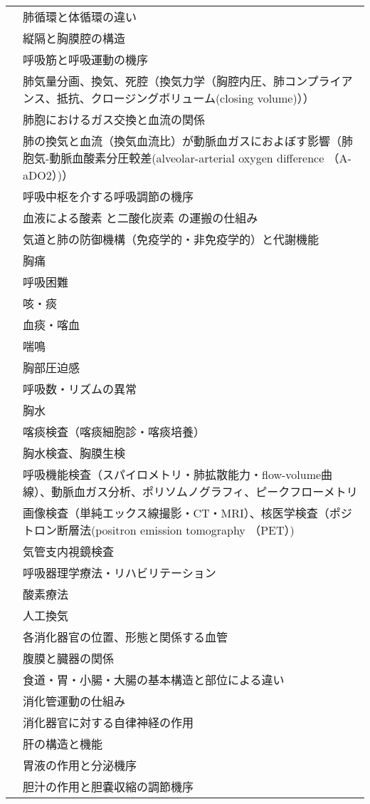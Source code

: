 \begin{xltabular}{\linewidth}{XX}
 & 肺循環と体循環の違い \\
 & 縦隔と胸膜腔の構造 \\
 & 呼吸筋と呼吸運動の機序 \\
 & 肺気量分画、換気、死腔（換気力学（胸腔内圧、肺コンプライアンス、抵抗、クロージングボリューム(closing volume)）） \\
 & 肺胞におけるガス交換と血流の関係 \\
 & 肺の換気と血流（換気血流比）が動脈血ガスにおよぼす影響（肺胞気-動脈血酸素分圧較差(alveolar-arterial oxygen difference （A-aDO2）)） \\
 & 呼吸中枢を介する呼吸調節の機序 \\
 & 血液による酸素 と二酸化炭素 の運搬の仕組み \\
 & 気道と肺の防御機構（免疫学的・非免疫学的）と代謝機能 \\
 & 胸痛 \\
 & 呼吸困難 \\
 & 咳・痰 \\
 & 血痰・喀血 \\
 & 喘鳴 \\
 & 胸部圧迫感 \\
 & 呼吸数・リズムの異常 \\
 & 胸水 \\
 & 喀痰検査（喀痰細胞診・喀痰培養） \\
 & 胸水検査、胸膜生検 \\
 & 呼吸機能検査（スパイロメトリ・肺拡散能力・flow-volume曲線）、動脈血ガス分析、ポリソムノグラフィ、ピークフローメトリ \\
 & 画像検査（単純エックス線撮影・CT・MRI）、核医学検査（ポジトロン断層法(positron emission tomography （PET）) \\
 & 気管支内視鏡検査 \\
 & 呼吸器理学療法・リハビリテーション \\
 & 酸素療法 \\
 & 人工換気 \\
 & 各消化器官の位置、形態と関係する血管 \\
 & 腹膜と臓器の関係 \\
 & 食道・胃・小腸・大腸の基本構造と部位による違い \\
 & 消化管運動の仕組み \\
 & 消化器官に対する自律神経の作用 \\
 & 肝の構造と機能 \\
 & 胃液の作用と分泌機序 \\
 & 胆汁の作用と胆嚢収縮の調節機序 \\

\end{xltabular}
